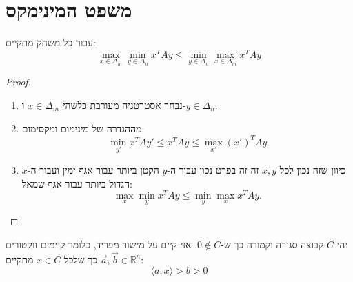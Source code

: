 \documentclass{tstextbook}
\begin{document}
\section{משפט המינימקס}

\begin{proposition}
עבור כל משחק מתקיים:
$$\operatorname*{max}_{x\in\Delta_{m}}\operatorname*{min}_{y\in\Delta_{n}}x^{T}A y\leq\operatorname*{min}_{y\in\Delta_{n}}\operatorname*{max}_{x\in\Delta_{m}}x^{T}A y$$

\end{proposition}
\begin{proof}
  \begin{enumerate}
    \item נבחר אסטרטגיה מעורבת כלשהי \(x \in \Delta _m\) ו-\(y \in \Delta_{n}\). 


    \item מההגדרה של מינימום ומקסימום: 
$$\min _{y'}x^{T}Ay'\leq x^{T}Ay\leq \max _{x'}(x')^{T}Ay$$


    \item כיוון שזה נכון לכל \(x,y\) זה זה בפרט נכון עבור ה-\(y\) הקטן ביותר עבור אגף ימין ועבור ה-\(x\) הגדול ביותר עבור אגף שמאל: 
$$\operatorname*{max}_{x}\operatorname*{min}_{y}x^{T}A y\leq\operatorname*{min}_{y}\operatorname*{max}_{x}x^{T}A y.$$


  \end{enumerate}
\end{proof}
\begin{proposition}
יהי \(C\) קבוצה סגורה וקמורה כך ש-\(0 \not \in C\). אזי קיים על מישור מפריד, כלומר קיימים ווקטורים \(\vec{a},\vec{b}\in \mathbb{R}^{n}\) כך שלכל \(x \in C\) מתקיים:
$$\langle a,x \rangle > b > 0$$

\end{proposition}
\end{document}
